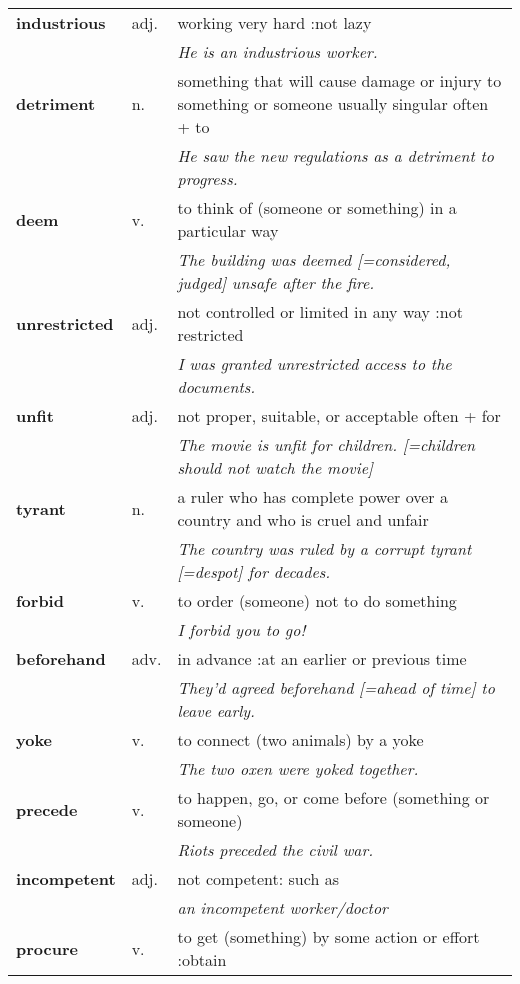 \documentclass[a4paper]{article}
\begin{document}
\begin{longtable}{llp{11cm}}
\textbf{industrious} & adj. &  working very hard :not lazy \\
 & & \textit{He is an industrious worker.}\\[0.08cm]
\textbf{detriment} & n. &  something that will cause damage or injury to something or someone usually singular often + to \\
 & & \textit{He saw the new regulations as a detriment to progress.}\\[0.08cm]
\textbf{deem} & v. &  to think of (someone or something) in a particular way \\
 & & \textit{The building was deemed [=considered, judged] unsafe after the fire.}\\[0.08cm]
\textbf{unrestricted} & adj. &  not controlled or limited in any way :not restricted \\
 & & \textit{I was granted unrestricted access to the documents.}\\[0.08cm]
\textbf{unfit} & adj. &  not proper, suitable, or acceptable often + for \\
 & & \textit{The movie is unfit for children. [=children should not watch the movie]}\\[0.08cm]
\textbf{tyrant} & n. &  a ruler who has complete power over a country and who is cruel and unfair \\
 & & \textit{The country was ruled by a corrupt tyrant [=despot] for decades.}\\[0.08cm]
\textbf{forbid} & v. &  to order (someone) not to do something \\
 & & \textit{I forbid you to go!}\\[0.08cm]
\textbf{beforehand} & adv. &  in advance :at an earlier or previous time \\
 & & \textit{They'd agreed beforehand [=ahead of time] to leave early.}\\[0.08cm]
\textbf{yoke} & v. &  to connect (two animals) by a yoke \\
 & & \textit{The two oxen were yoked together.}\\[0.08cm]
\textbf{precede} & v. &  to happen, go, or come before (something or someone) \\
 & & \textit{Riots preceded the civil war.}\\[0.08cm]
\textbf{incompetent} & adj. &  not competent: such as\\
 & & \textit{an incompetent worker/doctor}\\[0.08cm]
\textbf{procure} & v. &  to get (something) by some action or effort :obtain \\

\end{longtable}
\end{document}
